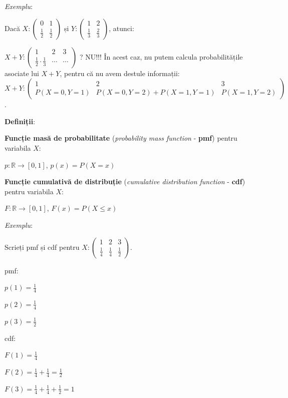 \documentclass[12pt]{article}
\begin{document}
	\textit{Exemplu}:
	
	Dacă $X : \begin{pmatrix}
	0 & 1\\
	\frac{1}{2} & \frac{1}{2}
	\end{pmatrix}$ și $Y : \begin{pmatrix}
	1 & 2\\
	\frac{1}{3} & \frac{2}{3}
	\end{pmatrix}$, atunci:
	
	$X + Y: \begin{pmatrix}
	1 & 2 & 3\\
	\frac{1}{2} \cdot \frac{1}{3} & \cdots & \cdots
	\end{pmatrix}$
	?
	NU!!! În acest caz, nu putem calcula probabilitățile asociate lui $X + Y$, pentru că nu avem destule informații:
	$X + Y: \begin{pmatrix}
	1 & 2 & 3\\
	P(X = 0,Y = 1) & P(X = 0, Y = 2) + P(X = 1, Y = 1) & P(X = 1, Y = 2)
	\end{pmatrix}$.
	
	\textbf{Definiții}: 
	
	\textbf{Funcție masă de probabilitate} (\textit{probability mass function} - \textbf{pmf}) pentru variabila $X$: 
	
	$p : \mathbb{R} \rightarrow [0,1]$, $p(x) = P(X = x)$
	
	\textbf{Funcție cumulativă de distribuție} (\textit{cumulative distribution function} - \textbf{cdf}) pentru variabila $X$:
	
	$F : \mathbb{R} \rightarrow [0,1]$, $F(x) = P(X \leq x)$
	
	\textit{Exemplu}:
	
	Scrieți pmf și cdf pentru
	$X : \begin{pmatrix}
	1 & 2& 3\\
	\frac{1}{4} & \frac{1}{4} & \frac{1}{2}
	\end{pmatrix}$.
	
	pmf:
	
	$p(1) = \frac{1}{4}$
	
	$p(2) = \frac{1}{4}$
	
	$p(3) = \frac{1}{2}$
	
	cdf:
	
	$F(1) = \frac{1}{4}$
	
	$F(2) = \frac{1}{4} + \frac{1}{4} = \frac{1}{2}$
	
	$F(3) = \frac{1}{4} + \frac{1}{4} + \frac{1}{2} = 1$
	
\end{document}
